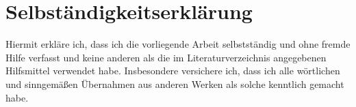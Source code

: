 \section{Selbständigkeitserklärung}
Hiermit erkläre ich, dass ich die vorliegende Arbeit selbstständig und ohne fremde Hilfe verfasst und keine anderen als die im Literaturverzeichnis angegebenen Hilfsmittel verwendet habe. Insbesondere versichere ich, dass ich alle wörtlichen und sinngemäßen Übernahmen aus anderen Werken als solche kenntlich gemacht habe. 